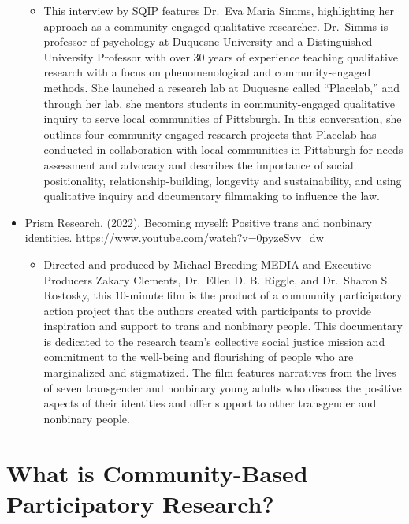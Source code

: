 \documentclass[
  11pt,
]{book}
\providecommand{\tightlist}{%
  \setlength{\itemsep}{0pt}\setlength{\parskip}{0pt}}
\begin{document}
\begin{itemize}
  \begin{itemize}
  \tightlist
  \item
    This interview by SQIP features Dr.~Eva Maria Simms, highlighting her approach as a community-engaged qualitative researcher. Dr.~Simms is professor of psychology at Duquesne University and a Distinguished University Professor with over 30 years of experience teaching qualitative research with a focus on phenomenological and community-engaged methods. She launched a research lab at Duquesne called ``Placelab,'' and through her lab, she mentors students in community-engaged qualitative inquiry to serve local communities of Pittsburgh. In this conversation, she outlines four community-engaged research projects that Placelab has conducted in collaboration with local communities in Pittsburgh for needs assessment and advocacy and describes the importance of social positionality, relationship-building, longevity and sustainability, and using qualitative inquiry and documentary filmmaking to influence the law.
  \end{itemize}
\item
  Prism Research. (2022). Becoming myself: Positive trans and nonbinary identities. \url{https://www.youtube.com/watch?v=0pyzeSvv_dw}

  \begin{itemize}
  \tightlist
  \item
    Directed and produced by Michael Breeding MEDIA and Executive Producers Zakary Clements, Dr.~Ellen D. B. Riggle, and Dr.~Sharon S. Rostosky, this 10-minute film is the product of a community participatory action project that the authors created with participants to provide inspiration and support to trans and nonbinary people. This documentary is dedicated to the research team's collective social justice mission and commitment to the well-being and flourishing of people who are marginalized and stigmatized. The film features narratives from the lives of seven transgender and nonbinary young adults who discuss the positive aspects of their identities and offer support to other transgender and nonbinary people.
  \end{itemize}
\end{itemize}

\hypertarget{what-is-community-based-participatory-research}{%
\section{What is Community-Based Participatory Research?}\label{what-is-community-based-participatory-research}}
\end{document}
